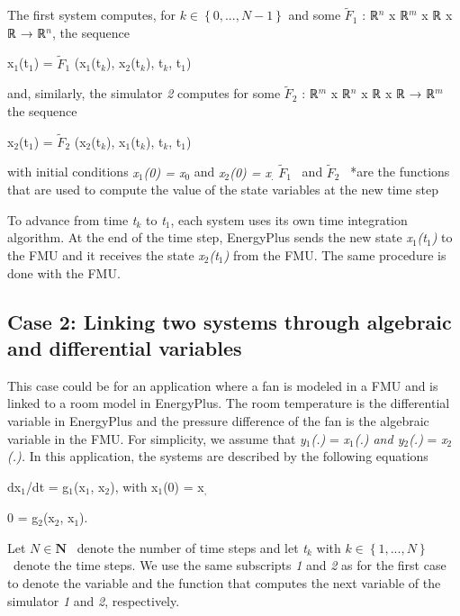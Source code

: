 The first system computes, for \(k\in\left\{0,...,N-1\right\}\) and some \(\tilde{F}_1\) : ℝ\(^{n}\) x ℝ\(^{m}\) x ℝ x ℝ → ℝ\(^{n}\), the sequence

x\(_{1}\)(t\(_{1}\)) = \(\tilde{F}_1\) (x\(_{1}\)(t\(_{k}\)), x\(_{2}\)(t\(_{k}\)), t\(_{k}\), t\(_{1}\))

and, similarly, the simulator \emph{2} computes for some \(\tilde{F}_2\) : ℝ\(^{m}\) x ℝ\(^{n}\) x ℝ x ℝ → ℝ\(^{m}\) the sequence

x\(_{2}\)(t\(_{1}\)) = \(\tilde{F}_2\) (x\(_{2}\)(t\(_{k}\)), x\(_{1}\)(t\(_{k}\)), t\(_{k}\), t\(_{1}\))

with initial conditions \emph{x\(_{1}\)(0) = x\(_{0}\)} and \emph{x\(_{2}\)(0) = x\(_{.}\)} \(\tilde{F}_1\) ~and \(\tilde{F}_2\) ~*are the functions that are used to compute the value of the state variables at the new time step

To advance from time \emph{t\(_{k}\)} to \emph{t\(_{1}\)}, each system uses its own time integration algorithm. At the end of the time step, EnergyPlus sends the new state \emph{x\(_{1}\)(t\(_{1}\))} to the FMU and it receives the state \emph{x\(_{2}\)(t\(_{1}\))} from the FMU. The same procedure is done with the FMU.

\subsection{Case 2: Linking two systems through algebraic and differential variables}\label{case-2-linking-two-systems-through-algebraic-and-differential-variables}

This case could be for an application where a fan is modeled in a FMU and is linked to a room model in EnergyPlus. The room temperature is the differential variable in EnergyPlus and the pressure difference of the fan is the algebraic variable in the FMU. For simplicity, we assume that \emph{y\(_{1}\)(.)} = \emph{x\(_{1}\)(.) and y\(_{2}\)(.)} = \emph{x\(_{2}\)(.).} In this application, the systems are described by the following equations

dx\(_{1}\)/dt = g\(_{1}\)(x\(_{1}\), x\(_{2}\)), with x\(_{1}\)(0) = x\(_{,}\)

0 = g\(_{2}\)(x\(_{2}\), x\(_{1}\)).

Let \(N\in\mathbf{N}\) ~denote the number of time steps and let \emph{t\(_{k}\)} with \(k\in\left\{1,...,N\right\}\) ~denote the time steps. We use the same subscripts \emph{1} and \emph{2} as for the first case to denote the variable and the function that computes the next variable of the simulator \emph{1} and \emph{2}, respectively.

